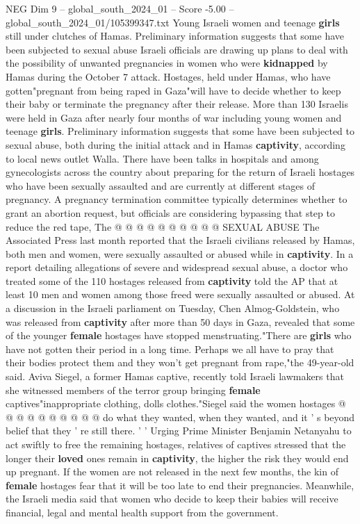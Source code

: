 \begin{textsample}{NEG Dim 9 – global\_south\_2024\_01 – Score -5.00 – global\_south\_2024\_01/105399347.txt}  \label{ex:f9_neg_426}
Young Israeli women and teenage \textbf{girls} still under clutches of Hamas.
Preliminary information suggests that some have been subjected to sexual abuse Israeli officials are drawing up plans to deal with the possibility of unwanted pregnancies in women who were \textbf{kidnapped} by Hamas during the October 7 attack.
Hostages, held under Hamas, who have gotten"pregnant from being raped in Gaza"will have to decide whether to keep their baby or terminate the pregnancy after their release.
More than 130 Israelis were held in Gaza after nearly four months of war including young women and teenage \textbf{girls}.
Preliminary information suggests that some have been subjected to sexual abuse, both during the initial attack and in Hamas \textbf{captivity}, according to local news outlet Walla.
There have been talks in hospitals and among gynecologists across the country about preparing for the return of Israeli hostages who have been sexually assaulted and are currently at different stages of pregnancy.
A pregnancy termination committee typically determines whether to grant an abortion request, but officials are considering bypassing that step to reduce the red tape, The @ @ @ @ @ @ @ @ @ @ SEXUAL ABUSE The Associated Press last month reported that the Israeli civilians released by Hamas, both men and women, were sexually assaulted or abused while in \textbf{captivity}.
In a report detailing allegations of severe and widespread sexual abuse, a doctor who treated some of the 110 hostages released from \textbf{captivity} told the AP that at least 10 men and women among those freed were sexually assaulted or abused.
At a discussion in the Israeli parliament on Tuesday, Chen Almog-Goldstein, who was released from \textbf{captivity} after more than 50 days in Gaza, revealed that some of the younger \textbf{female} hostages have stopped menstruating."There are \textbf{girls} who have not gotten their period in a long time.
Perhaps we all have to pray that their bodies protect them and they won't get pregnant from rape,"the 49-year-old said.
Aviva Siegel, a former Hamas captive, recently told Israeli lawmakers that she witnessed members of the terror group bringing \textbf{female} captives"inappropriate clothing, dolls clothes."Siegel said the women hostages @ @ @ @ @ @ @ @ @ @ do what they wanted, when they wanted, and it ' s beyond belief that they ' re still there. ' ' Urging Prime Minister Benjamin Netanyahu to act swiftly to free the remaining hostages, relatives of captives stressed that the longer their \textbf{loved} ones remain in \textbf{captivity}, the higher the risk they would end up pregnant.
If the women are not released in the next few months, the kin of \textbf{female} hostages fear that it will be too late to end their pregnancies.
Meanwhile, the Israeli media said that women who decide to keep their babies will receive financial, legal and mental health support from the government.

\end{textsample}
